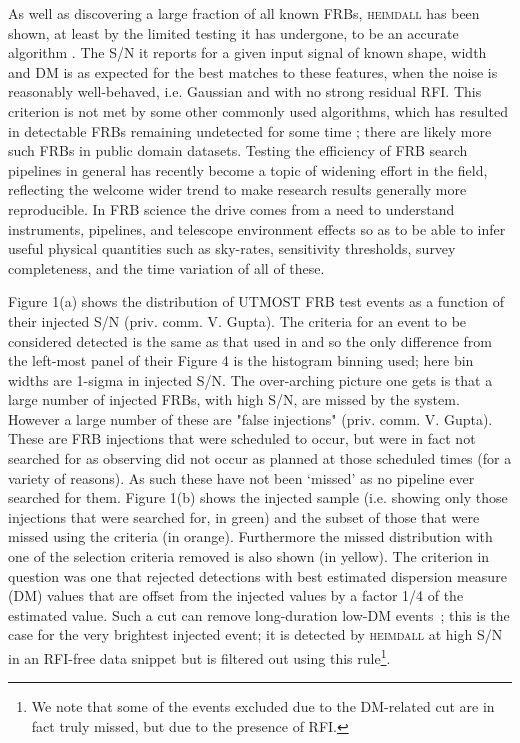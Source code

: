 \documentclass[RNAAS]{aastex62}
\begin{document}
As well as discovering a large fraction of all known FRBs, \textsc{heimdall} has been shown, at least by the limited testing it has undergone, to be an accurate algorithm \citep{kp15}. The S/N it reports for a given input signal of known shape, width and DM is as expected for the best matches to these features, when the noise is reasonably well-behaved, i.e. Gaussian and with no strong residual RFI. This criterion is not met by some other commonly used algorithms, which has resulted in detectable FRBs remaining undetected for some time \citep{Crawford2016,Zhang2019,Keane2019}; there are likely more such FRBs in public domain datasets. Testing the efficiency of FRB search pipelines in general has recently become a topic of widening effort in the field, reflecting the welcome wider trend to make research results generally more reproducible. In FRB science the drive comes from a need to understand instruments, pipelines, and telescope environment effects so as to be able to infer useful physical quantities such as sky-rates, sensitivity thresholds, survey completeness, and the time variation of all of these.

Figure 1(a) shows the distribution of UTMOST FRB test events as a function of their injected S/N (priv. comm. V. Gupta). The criteria for an event to be considered detected is the same as that used in \citet{Wael2019} and so the only difference from the left-most panel of their Figure 4 is the histogram binning used; here bin widths are 1-sigma in injected S/N. The over-arching picture one gets is that a large number of injected FRBs, with high S/N, are missed by the system. However a large number of these are "false injections" (priv. comm. V. Gupta). These are FRB injections that were scheduled to occur, but were in fact not searched for as observing did not occur as planned at those scheduled times (for a variety of reasons). As such these have not been `missed' as no pipeline ever searched for them. Figure 1(b) shows the injected sample (i.e. showing only those injections that were searched for, in green) and the subset of those that were missed using the \citet{Wael2019} criteria (in orange). Furthermore the missed distribution with one of the selection criteria removed is also shown (in yellow). The criterion in question was one that rejected detections with best estimated dispersion measure (DM) values that are offset from the injected values by a factor 1/4 of the estimated value. Such a cut can remove long-duration low-DM events~\citep{cm03}; this is the case for the very brightest injected event; it is detected by \textsc{heimdall} at high S/N in an RFI-free data snippet but is filtered out using this rule\footnote{We note that some of the events excluded due to the DM-related cut are in fact truly missed, but due to the presence of RFI.}.
\end{document}
